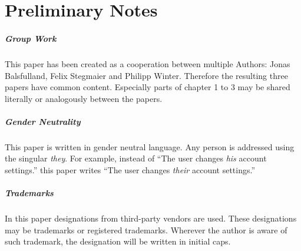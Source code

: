 \clearpage
\chapter*{Preliminary Notes}
\thispagestyle{empty}

\paragraph{Group Work}
This paper has been created as a cooperation between multiple Authors: 
Jonas Balsfulland, Felix Stegmaier and Philipp Winter.
Therefore the resulting three papers have common content.
Especially parts of chapter 1 to 3 may be shared literally or analogously between the papers.



\paragraph{Gender Neutrality}
This paper is written in gender neutral language.
Any person is addressed using the singular \textit{they}.
For example, instead of 
``The user changes \textit{his} account settings.''
this paper writes 
``The user changes \textit{their} account settings.''

\paragraph{Trademarks}
In this paper designations from third-party vendors are used.
These designations may be trademarks or registered trademarks.
Wherever the author is aware of such trademark, 
the designation will be written in initial caps.


